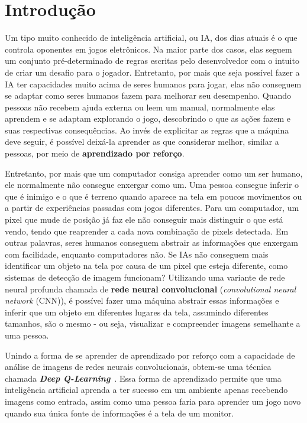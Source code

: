 
\chapter{Introdução}
\label{cap:introducao}

Um tipo muito conhecido de inteligência artificial, ou IA, dos dias atuais é o que controla oponentes em jogos eletrônicos.
Na maior parte dos casos, elas seguem um conjunto pré-determinado de regras escritas pelo desenvolvedor com o intuito de criar um desafio para o jogador.
Entretanto, por mais que seja possível fazer a IA ter capacidades muito acima de seres humanos para jogar, elas não conseguem se adaptar como seres humanos fazem para melhorar seu desempenho.
Quando pessoas não recebem ajuda externa ou leem um manual, normalmente elas aprendem e se adaptam explorando o jogo, descobrindo o que as ações fazem e suas respectivas consequências.
Ao invés de explicitar as regras que a máquina deve seguir, é possível deixá-la aprender as que considerar melhor, similar a pessoas, por meio de \textbf{aprendizado por reforço}.

Entretanto, por mais que um computador consiga aprender como um ser humano, ele normalmente não consegue enxergar como um.
Uma pessoa consegue inferir o que é inimigo e o que é terreno quando aparece na tela em poucos movimentos ou a partir de experiências passadas com jogos diferentes.
Para um computador, um pixel que mude de posição já faz ele não conseguir mais distinguir o que está vendo, tendo que reaprender a cada nova combinação de pixels detectada.
Em outras palavras, seres humanos conseguem abstrair as informações que enxergam com facilidade, enquanto computadores não.
Se IAs não conseguem mais identificar um objeto na tela por causa de um pixel que esteja diferente, como sistemas de detecção de imagem funcionam?
Utilizando uma variante de rede neural profunda chamada de \textbf{rede neural convolucional} (\textit{convolutional neural network} (CNN)), é possível fazer uma máquina abstrair essas informações e inferir que um objeto em diferentes lugares da tela, assumindo diferentes tamanhos, são o mesmo - ou seja, visualizar e compreender imagens semelhante a uma pessoa.

Unindo a forma de se aprender de aprendizado por reforço com a capacidade de análise de imagens de redes neurais convolucionais, obtem-se uma técnica chamada \textit{\textbf{Deep Q-Learning}}~\cite{DBLP:journals/corr/MnihKSGAWR13}.
Essa forma de aprendizado permite que uma inteligência artificial aprenda a ter sucesso em um ambiente apenas recebendo imagens como entrada, assim como uma pessoa faria para aprender um jogo novo quando sua única fonte de informações é a tela de um monitor.

